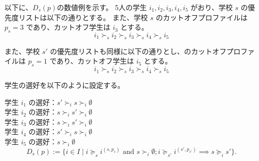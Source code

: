 \documentclass[12pt, a4paper]{article}
\theoremstyle{definition}
\theoremstyle{remark}
\theoremstyle{plain}
\begin{document}


以下に、$D_s(p)$の数値例を示す。
5人の学生 \( i_1, i_2, i_3, i_4, i_5 \) がおり、学校 \( s \) の優先度リストは以下の通りとする。 また、学校 \( s \) のカットオフプロファイルは \( p_s = 3 \) であり、カットオフ学生は \( i_3 \) とする。
  \[
  i_1 \succ_s i_2 \succ_s i_3 \succ_s i_4 \succ_s i_5
  \]

  また、学校 \( s' \) の優先度リストも同様に以下の通りとし、のカットオフプロファイルは \( p_s = 1 \) であり、カットオフ学生は \( i_5 \) とする。
  \[
  i_1 \succ_s i_2 \succ_s i_3 \succ_s i_4 \succ_s i_5
  \]

学生の選好を以下のように設定する。

学生 \( i_1 \) の選好：$s' \succ_i s \succ_i \emptyset$ \\
学生 \( i_2 \) の選好：$s \succ_i s' \succ_i \emptyset$ \\
学生 \( i_3 \) の選好：$s \succ_i s' \succ_i \emptyset$ \\
学生 \( i_4 \) の選好：$s' \succ_i s \succ_i \emptyset$ \\
学生 \( i_5 \) の選好：$s \succ_i \emptyset$ \\
\[
  D_s(p) := \{i \in I \mid i \succeq_s i^{(s,p_s)} \text{ and } s \succ_i \emptyset; i \succeq_{s'} i^{(s',p_{s'})} \implies s \succeq_i s' \}.
\]
\end{document}
